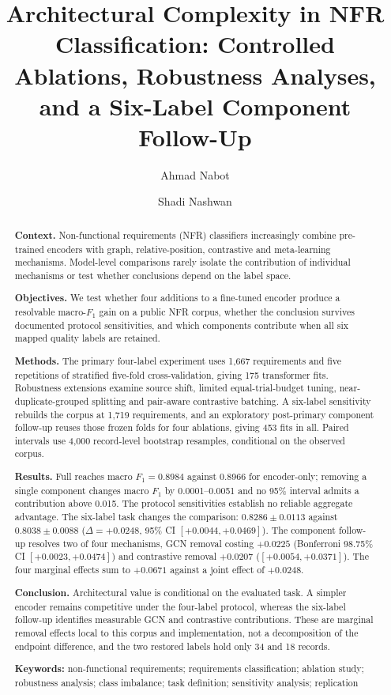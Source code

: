 \documentclass[11pt,a4paper]{article}
\title{\bfseries Architectural Complexity in NFR Classification: Controlled\\
Ablations, Robustness Analyses, and a Six-Label Component Follow-Up}
\author[1]{Ahmad Nabot}
\author[2]{Shadi Nashwan}
\affil[1]{\small Al-Zaytoonah University of Jordan, Amman, Jordan \\ \texttt{a.nabot@zuj.edu.jo}}
\affil[2]{\small Middle East University, Amman, Jordan \\ \texttt{snashwan@meu.edu.jo}}
\date{}
\begin{document}
\maketitle

\begin{abstract}
\noindent
\textbf{Context.} Non-functional requirements (NFR) classifiers increasingly combine pre-trained encoders
with graph, relative-position, contrastive and meta-learning mechanisms. Model-level comparisons rarely
isolate the contribution of individual mechanisms or test whether conclusions depend on the label space.

\noindent
\textbf{Objectives.} We test whether four additions to a fine-tuned encoder produce a resolvable
macro-$F_1$ gain on a public NFR corpus, whether the conclusion survives documented protocol
sensitivities, and which components contribute when all six mapped quality labels are retained.

\noindent
\textbf{Methods.} The primary four-label experiment uses 1,667 requirements and five repetitions of
stratified five-fold cross-validation, giving 175 transformer fits. Robustness extensions examine source
shift, limited equal-trial-budget tuning, near-duplicate-grouped splitting and pair-aware contrastive
batching. A six-label sensitivity rebuilds the corpus at 1,719 requirements, and an exploratory
post-primary component follow-up reuses those frozen folds for four ablations, giving 453 fits in all.
Paired intervals use 4,000 record-level bootstrap resamples, conditional on the observed corpus.

\noindent
\textbf{Results.} Full reaches macro $F_1 = 0.8984$ against 0.8966 for encoder-only; removing a single
component changes macro $F_1$ by 0.0001--0.0051 and no 95\% interval admits a contribution above 0.015.
The protocol sensitivities establish no reliable aggregate advantage. The six-label task changes the
comparison: $0.8286 \pm 0.0113$ against $0.8038 \pm 0.0088$ ($\Delta = +0.0248$, 95\% CI
$[+0.0044, +0.0469]$). The component follow-up resolves two of four mechanisms, GCN removal costing
$+0.0225$ (Bonferroni 98.75\% CI $[+0.0023, +0.0474]$) and contrastive removal $+0.0207$
($[+0.0054, +0.0371]$). The four marginal effects sum to $+0.0671$ against a joint effect of $+0.0248$.

\noindent
\textbf{Conclusion.} Architectural value is conditional on the evaluated task. A simpler encoder remains
competitive under the four-label protocol, whereas the six-label follow-up identifies measurable GCN and
contrastive contributions. These are marginal removal effects local to this corpus and implementation,
not a decomposition of the endpoint difference, and the two restored labels hold only 34 and 18 records.

\medskip
\noindent\textbf{Keywords:} non-functional requirements; requirements classification; ablation study;
robustness analysis; class imbalance; task definition; sensitivity analysis; replication
\end{abstract}
\end{document}
